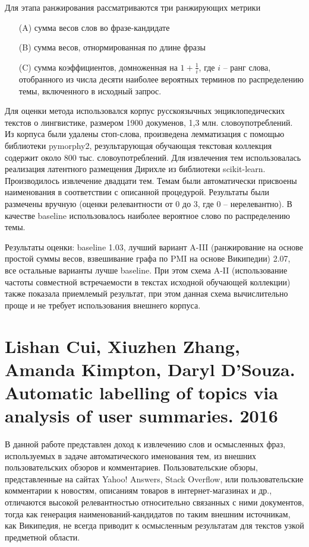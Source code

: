 Для этапа ранжирования рассматриваются три ранжирующих метрики
\begin{itemize}
    \item[(A)] сумма весов слов во фразе-кандидате  
    \item[(B)] сумма весов, отнормированная по длине фразы
    \item[(C)] сумма коэффициентов, домноженная на $1 + \frac{1}{i}$, где $i$ -- ранг слова, отобранного из числа десяти наиболее вероятных терминов по распределению темы, включенного в исходный запрос.
\end{itemize} 

Для оценки метода использовался корпус русскоязычных энциклопедических текстов о лингвистике, размером 1900 докуменов, 1,3 млн. словоупотреблений. Из корпуса были удалены стоп-слова, произведена лемматизация с помощью библиотеки pymorphy2, результарующая обучающая текстовая коллекция содержит около 800 тыс. словоупотреблений. Для извлечения тем использовалась реализация латентного размещения Дирихле из библиотеки scikit-learn. Производилось извлечение двадцати тем. Темам были автоматически присвоены наименования в соответствии с описанной процедурой. Результаты были размечены вручную (оценки релевантности от 0 до 3, где 0 -- нерелевантно). В качестве baseline использовалось наиболее вероятное слово по распределению темы. 

Результаты оценки: baseline 1.03, лучший вариант A-III (ранжирование на основе простой суммы весов, взвешивание графа по PMI на основе Википедии) 2.07, все остальные варианты лучше baseline. При этом схема A-II (использование частоты совместной встречаемости в текстах исходной обучающей коллекции) также показала приемлемый результат, при этом данная схема вычислительно проще и не требует использования внешнего корпуса. 


\section{Lishan Cui, Xiuzhen Zhang, Amanda Kimpton, Daryl D'Souza. Automatic labelling of topics via analysis of user summaries. 2016}

В данной работе представлен доход к извлечению слов и осмысленных фраз, используемых в задаче автоматического именования тем, из внешних пользовательских обзоров и комментариев. Пользовательские обзоры, представленные на сайтах Yahoo! Answers, Stack Overflow, или пользовательские комментарии к новостям, описаниям товаров в интернет-магазинах и др., отличаются высокой релевантностью относительно связанных с ними документов, тогда как генерация наименований-кандидатов по таким внешним источникам, как Википедия, не всегда приводит к осмысленным результатам для текстов узкой предметной области.

